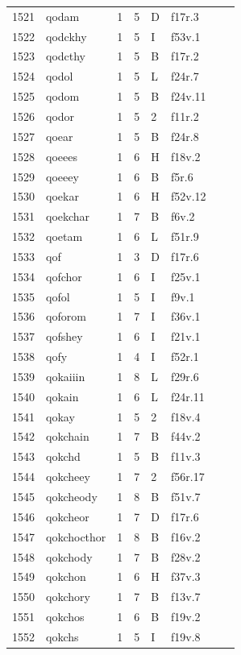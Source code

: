 \documentclass[11pt,a4paper]{article}
\begin{document}
\begin{landscape}
\begin{longtable}{@{}r>{\ttfamily}lrrl>{\ttfamily}l>{\raggedright\arraybackslash}p{80mm}>{\raggedright\arraybackslash}p{36mm}@{}}
1521 & qodam & 1 & 5 & D & f17r.3 &  & \\
1522 & qodckhy & 1 & 5 & I & f53v.1 &  & \\
1523 & qodcthy & 1 & 5 & B & f17r.2 &  & \\
1524 & qodol & 1 & 5 & L & f24r.7 &  & \\
1525 & qodom & 1 & 5 & B & f24v.11 &  & \\
1526 & qodor & 1 & 5 & 2 & f11r.2 &  & \\
1527 & qoear & 1 & 5 & B & f24r.8 &  & \\
1528 & qoeees & 1 & 6 & H & f18v.2 &  & \\
1529 & qoeeey & 1 & 6 & B & f5r.6 &  & \\
1530 & qoekar & 1 & 6 & H & f52v.12 &  & \\
1531 & qoekchar & 1 & 7 & B & f6v.2 &  & \\
1532 & qoetam & 1 & 6 & L & f51r.9 &  & \\
1533 & qof & 1 & 3 & D & f17r.6 &  & \\
1534 & qofchor & 1 & 6 & I & f25v.1 &  & \\
1535 & qofol & 1 & 5 & I & f9v.1 &  & \\
1536 & qoforom & 1 & 7 & I & f36v.1 &  & \\
1537 & qofshey & 1 & 6 & I & f21v.1 &  & \\
1538 & qofy & 1 & 4 & I & f52r.1 &  & \\
1539 & qokaiiin & 1 & 8 & L & f29r.6 &  & \\
1540 & qokain & 1 & 6 & L & f24r.11 &  & \\
1541 & qokay & 1 & 5 & 2 & f18v.4 &  & \\
1542 & qokchain & 1 & 7 & B & f44v.2 &  & \\
1543 & qokchd & 1 & 5 & B & f11v.3 &  & \\
1544 & qokcheey & 1 & 7 & 2 & f56r.17 &  & \\
1545 & qokcheody & 1 & 8 & B & f51v.7 &  & \\
1546 & qokcheor & 1 & 7 & D & f17r.6 &  & \\
1547 & qokchocthor & 1 & 8 & B & f16v.2 &  & \\
1548 & qokchody & 1 & 7 & B & f28v.2 &  & \\
1549 & qokchon & 1 & 6 & H & f37v.3 &  & \\
1550 & qokchory & 1 & 7 & B & f13v.7 &  & \\
1551 & qokchos & 1 & 6 & B & f19v.2 &  & \\
1552 & qokchs & 1 & 5 & I & f19v.8 &  & \\

\end{longtable}
\end{landscape}
\end{document}
